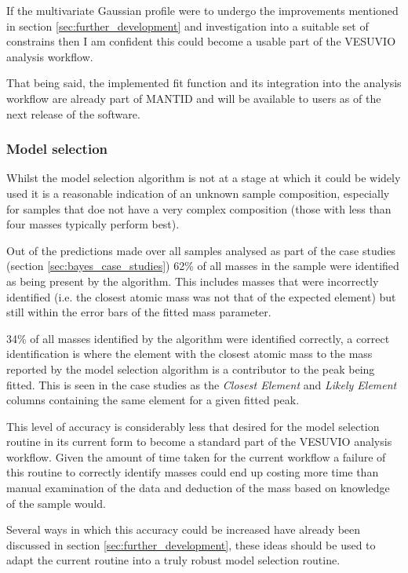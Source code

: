\documentclass[a4paper]{article}
\begin{document}
If the multivariate Gaussian profile were to undergo the improvements mentioned
in section \ref{sec:further_development} and investigation into a suitable set
of constrains then I am confident this could become a usable part of the VESUVIO
analysis workflow.

That being said, the implemented fit function and its integration into the
analysis workflow are already part of \gls*{MANTID} and will be available to
users as of the next release of the software.

\subsubsection{Model selection}

Whilst the model selection algorithm is not at a stage at which it could be
widely used it is a reasonable indication of an unknown sample composition,
especially for samples that doe not have a very complex composition (those with
less than four masses typically perform best).

Out of the predictions made over all samples analysed as part of the case
studies (section \ref{sec:bayes_case_studies}) 62\% of all masses in the sample
were identified as being present by the algorithm. This includes masses that
were incorrectly identified (i.e. the closest atomic mass was not that of the
expected element) but still within the error bars of the fitted mass parameter.

34\% of all masses identified by the algorithm were identified correctly, a
correct identification is where the element with the closest atomic mass to the
mass reported by the model selection algorithm is a contributor to the peak
being fitted. This is seen in the case studies as the \textit{Closest Element}
and \textit{Likely Element} columns containing the same element for a given
fitted peak.

This level of accuracy is considerably less that desired for the model selection
routine in its current form to become a standard part of the VESUVIO analysis
workflow. Given the amount of time taken for the current workflow a failure of
this routine to correctly identify masses could end up costing more time than
manual examination of the data and deduction of the mass based on knowledge of
the sample would.

Several ways in which this accuracy could be increased have already been
discussed in section \ref{sec:further_development}, these ideas should be used
to adapt the current routine into a truly robust model selection routine.
\end{document}
